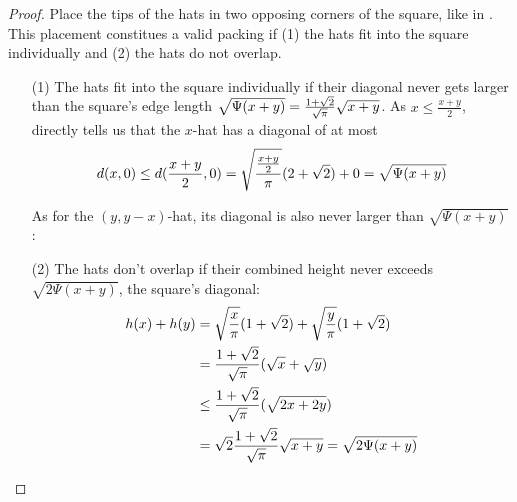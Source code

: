 \documentclass[%
    a4paper,              %
    style=print,          %
    bibliography=totoc,   %
    nexus,                %
    lnum,                 %
    extramargin,          %
]{tubsbook}
\begin{document}
\begin{proof}
    Place the tips of the hats in two opposing corners of the square, like in .
    This placement constitues a valid packing if (1) the hats fit into the square individually and (2) the hats do not overlap.

    \begin{itemize}
        \item[(1)]
            The hats fit into the square individually if their diagonal never gets larger than the square's edge length $\sqrt{\Psi(x+y)} = \frac{1+\sqrt{2}}{\sqrt{\pi}}\sqrt{x+y}$.
            As $x \le \frac {x+y} 2$,  directly tells us that the $x$-hat has a diagonal of at most
            \begin{align*}
                d(x,0) \le d(\frac{x+y}{2},0) = \sqrt{\frac{\frac{x+y}{2}}{\pi}}(2+\sqrt{2}) + 0 = \sqrt{\Psi(x+y)}
            \end{align*}

            As for the $(y,y-x)$-hat, its diagonal is also never larger than $\sqrt{\Psi(x+y)}$: 



        \item[(2)]
            The hats don't overlap if their combined height never exceeds $\sqrt{2\Psi(x+y)}$, the square's diagonal:
            \begin{align*}
                h(x) + h(y)
                &= \sqrt{\frac{x}{\pi}}(1+\sqrt{2}) + \sqrt{\frac{y}{\pi}}(1+\sqrt{2})\\
                &= \frac{1+\sqrt{2}}{\sqrt\pi}(\sqrt{x}+\sqrt{y})\\
                &\le \frac{1+\sqrt{2}}{\sqrt\pi}(\sqrt{2x+2y})\\
                &= \sqrt{2}\frac{1+\sqrt{2}}{\sqrt\pi}\sqrt{x+y} = \sqrt{2\Psi(x+y)} \qedhere
            \end{align*}
    \end{itemize}
\end{proof}
\end{document}
